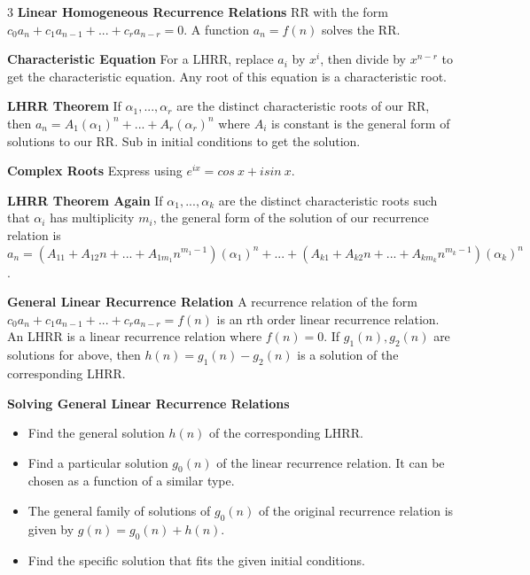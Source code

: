 \documentclass[10pt, landscape]{article}
\begin{document}
\begin{multicols*}{3}
\textbf{Linear Homogeneous Recurrence Relations} RR with the form $c_0a_n+c_1a_{n-1}+...+c_ra_{n-r}=0$. A function $a_n=f(n)$ solves the RR.

\textbf{Characteristic Equation} For a LHRR, replace $a_i$ by $x^i$, then divide by $x^{n-r}$ to get the characteristic equation. Any root of this equation is a characteristic root.

\textbf{LHRR Theorem} If $\alpha_1,...,\alpha_r$ are the distinct characteristic roots of our RR, then $a_n=A_1(\alpha_1)^n+...+A_r(\alpha_r)^n$ where $A_i$ is constant is the general form of solutions to our RR. Sub in initial conditions to get the solution.

\textbf{Complex Roots} Express using $e^{ix}=cos\ x+isin\ x$.

\textbf{LHRR Theorem Again} If $\alpha_1,...,\alpha_k$ are the distinct characteristic roots such that $\alpha_i$ has multiplicity $m_i$, the general form of the solution of our recurrence relation is $a_n=(A_{11}+A_{12}n+...+A_{1m_1}n^{m_1-1})(\alpha_1)^n+...+(A_{k1}+A_{k2}n+...+A_{km_k}n^{m_k-1})(\alpha_k)^n$.

\textbf{General Linear Recurrence Relation} A recurrence relation of the form $c_0a_n+c_1a_{n-1}+...+c_ra_{n-r}=f(n)$ is an rth order linear recurrence relation. An LHRR is a linear recurrence relation where $f(n)=0$. If $g_1(n), g_2(n)$ are solutions for above, then $h(n)=g_1(n)-g_2(n)$ is a solution of the corresponding LHRR.

\textbf{Solving General Linear Recurrence Relations}
\begin{itemize}
    \item Find the general solution $h(n)$ of the corresponding LHRR.
    \item Find a particular solution $g_0(n)$ of the linear recurrence relation. It can be chosen as a function of a similar type.
    \item The general family of solutions of $g_0(n)$ of the original recurrence relation is given by $g(n)=g_0(n)+h(n)$.
    \item Find the specific solution that fits the given initial conditions.
\end{itemize}


\end{multicols*}
\end{document}
